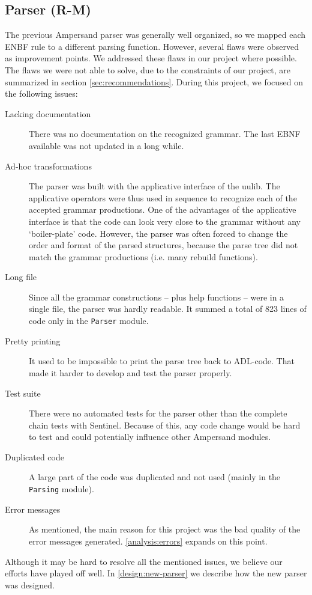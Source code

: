 
\subsection{Parser (R-M)}
\label{analysis:parser}
The previous Ampersand parser was generally well organized, so we mapped each ENBF rule to a different parsing function.
However, several flaws were observed as improvement points.
We addressed these flaws in our project where possible.
The flaws we were not able to solve, due to the constraints of our project, are summarized in section \autoref{sec:recommendations}.
During this project, we focused on the following issues:
\begin{description}
  \item[Lacking documentation]
    There was no documentation on the recognized grammar.
    The last EBNF available was not updated in a long while.
  
  \item[Ad-hoc transformations]
    The parser was built with the applicative interface of the uulib.
    The applicative operators were thus used in sequence to recognize each of the accepted grammar productions.
    One of the advantages of the applicative interface is that the code can look very close to the grammar without any `boiler-plate' code.
    However, the parser was often forced to change the order and format of the parsed structures, because the parse tree did not match the grammar productions (i.e. many rebuild functions).
    
  \item[Long file]
    Since all the grammar constructions -- plus help functions -- were in a single file, the parser was hardly readable.
    It summed a total of 823 lines of code only in the \texttt{Parser} module.
  
  \item[Pretty printing]
    It used to be impossible to print the parse tree back to ADL-code.
    That made it harder to develop and test the parser properly.
  
  \item[Test suite]
    There were no automated tests for the parser other than the complete chain tests with Sentinel.
    Because of this, any code change would be hard to test and could potentially influence other Ampersand modules.
  
  \item[Duplicated code]
    A large part of the code was duplicated and not used (mainly in the \texttt{Parsing} module).
  
  \item[Error messages]
    As mentioned, the main reason for this project was the bad quality of the error messages generated.
    \autoref{analysis:errors} expands on this point.
\end{description}
%
Although it may be hard to resolve all the mentioned issues, we believe our efforts have played off well.
In \autoref{design:new-parser} we describe how the new parser was designed.
